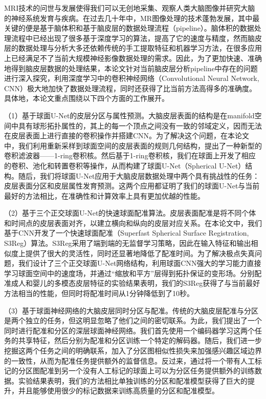 \cleardoublepage
{}
MRI技术的问世与发展使得我们可以无创地采集、观察人类大脑图像并研究大脑的神经系统发育与疾病。在过去几十年中，MR图像处理的技术蓬勃发展，其中最关键的便是基于脑体积和基于脑皮层的数据处理流程（pipeline）。脑体积的数据处理流程中已经出现了很多基于深度学习的算法，提高了它的速度与精度，然而脑皮层的数据处理与分析大多还依赖传统的手工提取特征和机器学习方法，在很多应用上已经满足不了当前大规模神经影像数据处理的需求。因此，为了更加快速、准确地得到脑皮层数据的处理结果，本论文针对当前脑皮层分析pipeline中存在的问题进行深入探究，利用深度学习中的卷积神经网络（Convolutional Neural Network, CNN）极大地加快了数据处理流程，同时还获得了比当前方法高得多的准确度。具体地，本论文重点围绕以下四个方面的工作展开。

（1）基于球面U-Net的皮层分区与属性预测。大脑皮层表面的结构是在manifold空间中具有球形拓扑属性的，其上的每一个顶点之间没有一致的邻域定义，因而无法在皮层表面上进行直接的卷积操作并搭建CNN。为了解决这个问题，在本论文中，我们利用重新采样到球面空间的皮层表面的规则几何结构，提出了一种新型的卷积滤波器——1-ring卷积核。然后基于1-ring卷积核，我们在球面上开发了相应的卷积、池化和转置卷积等操作，从而构建了球面U-Net（Spherical U-Net）结构。随后，我们将球面U-Net应用于大脑皮层数据处理中两个具有挑战性的任务：皮层表面分区和皮层属性发育预测。这两个应用都证明了我们的球面U-Net与当前最好的方法相比，在准确性和计算效率上具有更加优越的性能。

（2）基于三个正交球面U-Net的快速球面配准算法。皮层表面配准是将不同个体和时间点的皮层表面对齐，以建立横向和纵向的皮层对应关系。在本论文中，我们基于CNN开发了一个快速球面配准（Superfast Spherical Surface Registration, S3Reg）算法。S3Reg采用了端到端的无监督学习策略，因此在输入特征和输出相似度上提供了很大的灵活性，同时还显著地降低了配准时间。为了解决极点失真问题，我们设计了三个正交球面U-Net网络结构，利用球面CNN强大的学习能力直接学习球面空间中的速度场，并通过“缩放和平方”层得到拓扑保证的变形场。分别配准成人和婴儿的多模态皮层特征的实验结果表明，我们的S3Reg获得了与当前最好方法相当的性能，但同时将配准时间从1分钟降低到了10秒。	

（3）基于球面神经网络的大脑皮层同时分区与配准。传统的大脑皮层配准与分区是两个独立的任务，但这明显忽略了他们之间的密切联系。为此，我们提出了一个同时进行配准和分区的深层球面神经网络。我们首先使用一个编码器学习这两个任务的共享特征，然后分别为配准和分区训练一个特定的解码器。随后，我们进一步挖掘这两个任务之间的明确联系，加入了分区图相似性损失来加强感兴趣区域边界的一致性，从而为配准任务提供额外的监督信息。反过来，通过将一个带有人工标记的分区图配准到另一个没有人工标记的球面上可以为分区任务提供额外的训练数据。实验结果表明，我们的方法相比单独训练的分区和配准模型获得了巨大的提升，并且能够使用很少的标记数据来训练高质量的分区和配准模型。

